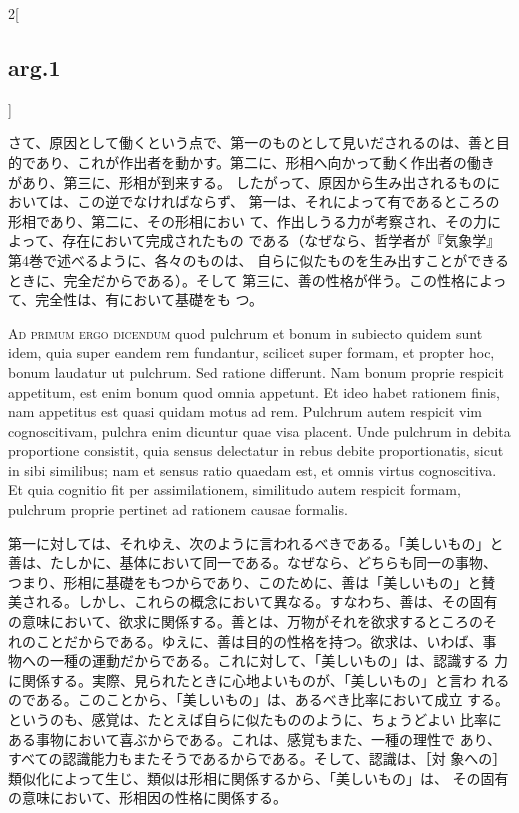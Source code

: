 \documentclass[paper=a4paper,fontsize=10pt,jafontsize=9pt,titlepage]{jlreq}
\begin{document}
\begin{paracol}{2}[\subsection{arg.1}]
\switchcolumn

さて、原因として働くという点で、第一のものとして見いだされるのは、善と目
 的であり、これが作出者を動かす。第二に、形相へ向かって動く作出者の働き
 があり、第三に、形相が到来する。
したがって、原因から生み出されるものにおいては、この逆でなければならず、
 第一は、それによって有であるところの形相であり、第二に、その形相におい
 て、作出しうる力が考察され、その力によって、存在において完成されたもの
 である（なぜなら、哲学者が『気象学』第4巻で述べるように、各々のものは、
 自らに似たものを生み出すことができるときに、完全だからである）。そして
 第三に、善の性格が伴う。この性格によって、完全性は、有において基礎をも
 つ。

\switchcolumn*[\subsection{ad.1}]

{\scshape Ad primum ergo dicendum} quod pulchrum et bonum in subiecto quidem
 sunt idem, quia super eandem rem fundantur, scilicet super formam, et
 propter hoc, bonum laudatur ut pulchrum. Sed ratione differunt. Nam
 bonum proprie respicit appetitum, est enim bonum quod omnia
 appetunt. Et ideo habet rationem finis, nam appetitus est quasi quidam
 motus ad rem. Pulchrum autem respicit vim cognoscitivam, pulchra enim
 dicuntur quae visa placent. Unde pulchrum in debita proportione
 consistit, quia sensus delectatur in rebus debite proportionatis, sicut
 in sibi similibus; nam et sensus ratio quaedam est, et omnis virtus
 cognoscitiva. Et quia cognitio fit per assimilationem, similitudo autem
 respicit formam, pulchrum proprie pertinet ad rationem causae formalis.

\switchcolumn

第一に対しては、それゆえ、次のように言われるべきである。「美しいもの」と
 善は、たしかに、基体において同一である。なぜなら、どちらも同一の事物、
 つまり、形相に基礎をもつからであり、このために、善は「美しいもの」と賛
 美される。しかし、これらの概念において異なる。すなわち、善は、その固有
 の意味において、欲求に関係する。善とは、万物がそれを欲求するところのそ
 れのことだからである。ゆえに、善は目的の性格を持つ。欲求は、いわば、事
 物への一種の運動だからである。これに対して、「美しいもの」は、認識する
 力に関係する。実際、見られたときに心地よいものが、「美しいもの」と言わ
 れるのである。このことから、「美しいもの」は、あるべき比率において成立
 する。というのも、感覚は、たとえば自らに似たもののように、ちょうどよい
 比率にある事物において喜ぶからである。これは、感覚もまた、一種の理性で
 あり、すべての認識能力もまたそうであるからである。そして、認識は、［対
 象への］類似化によって生じ、類似は形相に関係するから、「美しいもの」は、
 その固有の意味において、形相因の性格に関係する。


\end{paracol}
\end{document}
